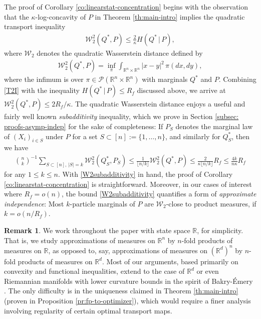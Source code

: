 \documentclass[11pt,reqno]{amsart}
\numberwithin{equation}{section}
\theoremstyle{definition}
\newtheorem{remark}[theorem]{Remark}
\def\R{{\mathbb R}}
\def\P{{\mathcal P}}
\def\W{{\mathcal W}}
\begin{document}
The proof of Corollary \ref{co:linearstat-concentration} begins with the observation that the $\kappa$-log-concavity of $P$ in Theorem \ref{th:main-intro} implies the quadratic transport inequality \cite[Theorems 1 and 2]{otto2000generalization}
\begin{align}
	\W_2^2(Q^*,P) \le \frac{2}{\kappa}H(Q^*\,|\,P), \label{T2I}
\end{align}
where $\W_2$ denotes the quadratic Wasserstein distance defined by
\begin{align*}
	\W_2^2(Q^*,P) = \inf_\pi \int_{\R^n \times \R^n} |x-y| ^2\,\pi(dx,dy),
\end{align*}
where the infimum is over $\pi \in \P(\R^n \times \R^n)$ with marginals $Q^*$ and $P$. Combining \eqref{T2I} with the inequality $H(Q^*\,|\,P) \le R_f$ discussed above, we arrive at $\W_2^2(Q^*,P) \le 2R_f/\kappa$. 
The quadratic Wasserstein distance enjoys a useful and fairly well known \emph{subadditivity} inequality, which we prove in Section \ref{subsec: proofs-asymp-indep} for the sake of completeness: If 
$P_S$ denotes the marginal law of $(X_i)_{i \in S}$ under $P$ for a set $S \subset [n]:=\{1,\ldots,n\}$, and similarly for $Q^*_S$, then we have
\begin{align}
	\binom{n}{k}^{-1}\sum_{S \subset [n], \, |S|=k} \W_2^2(Q^*_S,P_S) \le \frac{1}{\lfloor n/k\rfloor}\W_2^2(Q^*,P) \le \frac{2 }{\kappa\lfloor n/k\rfloor}R_f  \le \frac{4k}{n\kappa} R_f \label{W2subadditivity}
\end{align}
for any  $1 \le k \le n$. 
With \eqref{W2subadditivity} in hand, the proof of Corollary \ref{co:linearstat-concentration} is straightforward.
	Moreover, in our cases of interest where $R_f = o(n)$, the bound \eqref{W2subadditivity} quantifies a form of \emph{approximate independence}: Most $k$-particle marginals of $P$ are $\W_2$-close to product measures, if $k=o(n/R_f)$.


	\begin{remark}
		We work throughout the paper with state space $\R$, for simplicity. That is, we study approximations of measures on $\R^n$ by $n$-fold products of measures on $\R$, as opposed to, say, approximations of measures on $(\R^d)^n$ by $n$-fold products of measures on $\R^d$. Most of our arguments, based primarily on convexity and functional inequalities, extend to the case of $\R^d$ or even Riemannian manifolds with lower curvature bounds in the spirit of Bakry-\'Emery \cite{bakryemery,bakry2013analysis}. The only difficulty is in the uniqueness claimed in Theorem \ref{th:main-intro} (proven in Proposition \ref{pr:fp-to-optimizer}), which would require a finer analysis involving regularity of certain optimal transport maps.
	\end{remark}
\end{document}

